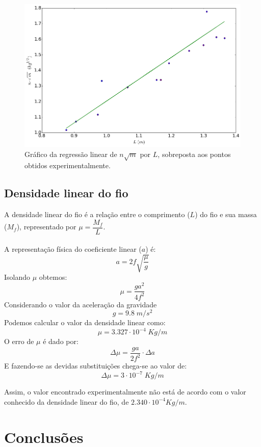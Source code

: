 \documentclass[12pt,a4paper]{article}
\begin{document}
\begin{figure} [!htbp]

\includegraphics[scale=0.6]{graf1.png}
\caption{Gráfico da regressão linear de $n\sqrt{m}$ por $L$, sobreposta aos pontos obtidos experimentalmente.}

\end{figure}
\subsection{Densidade linear do fio}
A densidade linear do fio é a relação entre o comprimento ($L$) do fio e sua massa ($M_f$), representado por $\mu = \dfrac{M_f}{L}$.\\\\
A representação física do coeficiente linear ($a$) é:
$$a = 2f \sqrt{\dfrac{\mu}{g}}$$
Isolando $\mu$ obtemos:
$$ \mu = \dfrac{ga^2}{4f^2} $$
Considerando o valor da aceleração da gravidade 
$$g = 9.8 \; m/s^2 $$
Podemos calcular o valor da densidade linear como:
$$ \mu = 3.327 \cdot 10^{-4} \; Kg/m$$
O erro de $\mu$ é dado por:
$$ \Delta \mu = \dfrac{ga}{2f^2} \cdot \Delta a$$
E fazendo-se as devidas substituições chega-se ao valor de:
$$\Delta \mu = 3 \cdot 10^{-7} \; Kg/m$$

Assim, o valor encontrado experimentalmente não está de acordo com o valor conhecido da densidade linear do fio, de $2.340 \cdot 10^{-4} Kg/m$.


\section{Conclusões}


\begin{thebibliography}{9}


\end{thebibliography}
\end{document}
